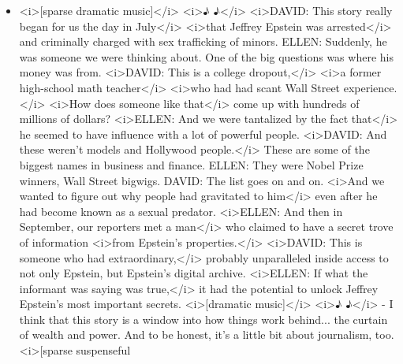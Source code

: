 \begin{itemize}
\tightlist
\item
  \textless{}i\textgreater{}{[}sparse dramatic
  music{]}\textless{}/i\textgreater{} \textless{}i\textgreater{}♪
  ♪\textless{}/i\textgreater{} \textless{}i\textgreater{}DAVID: This
  story really began for us the day in July\textless{}/i\textgreater{}
  \textless{}i\textgreater{}that Jeffrey Epstein was
  arrested\textless{}/i\textgreater{} and criminally charged with sex
  trafficking of minors. ELLEN: Suddenly, he was someone we were
  thinking about. One of the big questions was where his money was from.
  \textless{}i\textgreater{}DAVID: This is a college
  dropout,\textless{}/i\textgreater{} \textless{}i\textgreater{}a former
  high-school math teacher\textless{}/i\textgreater{}
  \textless{}i\textgreater{}who had had scant Wall Street
  experience.\textless{}/i\textgreater{} \textless{}i\textgreater{}How
  does someone like that\textless{}/i\textgreater{} come up with
  hundreds of millions of dollars? \textless{}i\textgreater{}ELLEN: And
  we were tantalized by the fact that\textless{}/i\textgreater{} he
  seemed to have influence with a lot of powerful people.
  \textless{}i\textgreater{}DAVID: And these weren't models and
  Hollywood people.\textless{}/i\textgreater{} These are some of the
  biggest names in business and finance. ELLEN: They were Nobel Prize
  winners, Wall Street bigwigs. DAVID: The list goes on and on.
  \textless{}i\textgreater{}And we wanted to figure out why people had
  gravitated to him\textless{}/i\textgreater{} even after he had become
  known as a sexual predator. \textless{}i\textgreater{}ELLEN: And then
  in September, our reporters met a man\textless{}/i\textgreater{} who
  claimed to have a secret trove of information
  \textless{}i\textgreater{}from Epstein's
  properties.\textless{}/i\textgreater{}
  \textless{}i\textgreater{}DAVID: This is someone who had
  extraordinary,\textless{}/i\textgreater{} probably unparalleled inside
  access to not only Epstein, but Epstein's digital archive.
  \textless{}i\textgreater{}ELLEN: If what the informant was saying was
  true,\textless{}/i\textgreater{} it had the potential to unlock
  Jeffrey Epstein's most important secrets.
  \textless{}i\textgreater{}{[}dramatic
  music{]}\textless{}/i\textgreater{} \textless{}i\textgreater{}♪
  ♪\textless{}/i\textgreater{} - I think that this story is a window
  into how things work behind... the curtain of wealth and power. And to
  be honest, it's a little bit about journalism, too.
  \textless{}i\textgreater{}{[}sparse suspenseful

\end{itemize}
